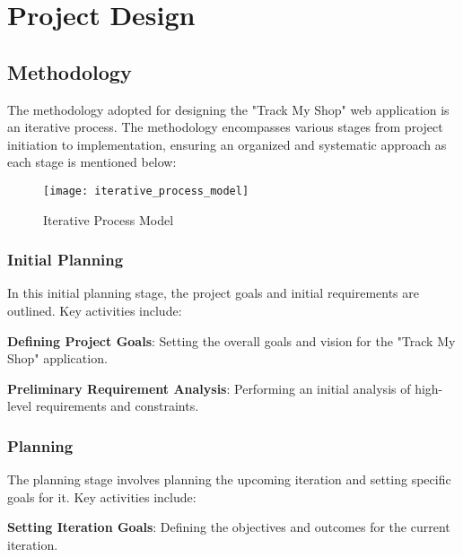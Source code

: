 
\chapter{Project Design} %

\label{Chapter3} %



\section{Methodology}
The methodology adopted for designing the "Track My Shop" web application is an iterative process. The methodology encompasses various stages from project initiation to implementation, ensuring an organized and systematic approach as each stage is mentioned below:

\begin{figure}[h]
	\centering
	\texttt{[image: iterative\_process\_model]}
	\caption{Iterative Process Model}
\end{figure}

\subsection{Initial Planning}

In this initial planning stage, the project goals and initial requirements are outlined. Key activities include:

\textbf{Defining Project Goals}: Setting the overall goals and vision for the "Track My Shop" application.

\textbf{Preliminary Requirement Analysis}:
Performing an initial analysis of high-level requirements and constraints.

\subsection{Planning}

The planning stage involves planning the upcoming iteration and setting specific goals for it. Key activities include:

\textbf{Setting Iteration Goals}:
Defining the objectives and outcomes for the current iteration.


